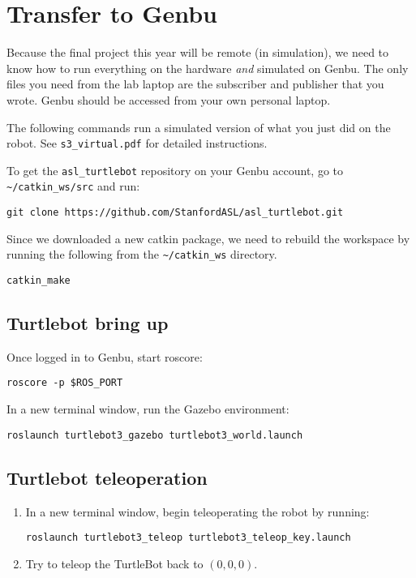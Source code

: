 \section{Transfer to Genbu}
Because the final project this year will be remote (in simulation), we need to know how to run everything on the hardware \textit{and} simulated on Genbu. The only files you need from the lab laptop are the subscriber and publisher that you wrote. Genbu should be accessed from your own personal laptop.

The following commands run a simulated version of what you just did on the robot. See \texttt{s3\_virtual.pdf} for detailed instructions.

To get the \texttt{asl\_turtlebot} repository on your Genbu account, go to \texttt{\textasciitilde/catkin\_ws/src} and run:

\begin{lstlisting}
git clone https://github.com/StanfordASL/asl_turtlebot.git
\end{lstlisting}

Since we downloaded a new catkin package, we need to rebuild the workspace by running the following from the \texttt{\textasciitilde/catkin\_ws} directory.

\begin{lstlisting}
catkin_make
\end{lstlisting}

\subsection{Turtlebot bring up}
Once logged in to Genbu, start roscore:

\begin{lstlisting}
roscore -p $ROS_PORT
\end{lstlisting}

In a new terminal window, run the Gazebo environment:

\begin{lstlisting}
roslaunch turtlebot3_gazebo turtlebot3_world.launch
\end{lstlisting}

\subsection{Turtlebot teleoperation}
\begin{enumerate}
\item In a new terminal window, begin teleoperating the robot by running:
\begin{lstlisting}
roslaunch turtlebot3_teleop turtlebot3_teleop_key.launch
\end{lstlisting}
\item Try to teleop the TurtleBot back to $(0,0,0)$.
\end{enumerate}

